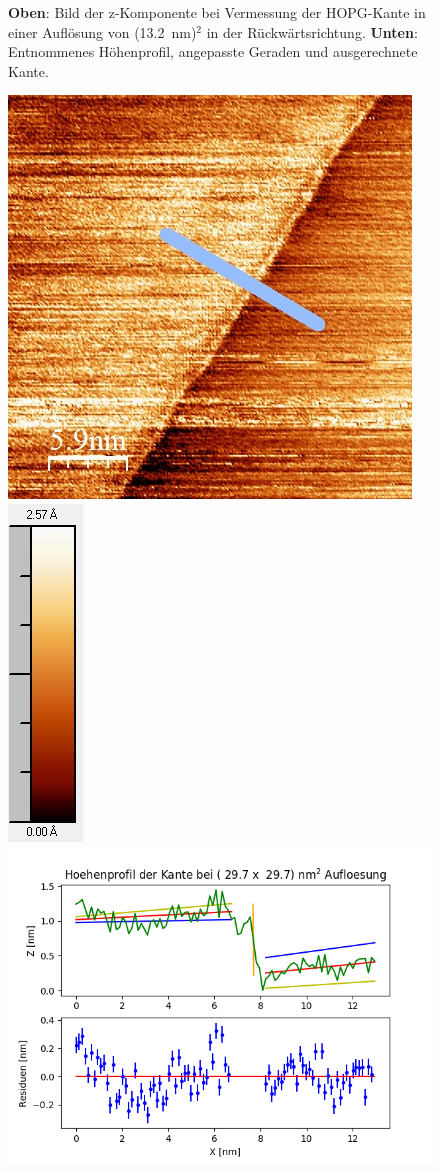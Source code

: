 \documentclass[12pt,a4paper]{article}
\begin{document}
\begin{figure}
\caption{\textbf{Oben}: Bild der z-Komponente bei Vermessung der HOPG-Kante in einer Auflösung von (\SI{13,2}{nm})$^2$ in der Rückwärtsrichtung. \textbf{Unten}: Entnommenes Höhenprofil, angepasste Geraden und ausgerechnete Kante.}
\end{figure}

\begin{figure}
\centering
\includegraphics[scale=0.6]{Bilder/Anhang/Kante/0297_Kante_vor.jpg}
\includegraphics[scale=0.6]{Bilder/Anhang/Kante/0297_Kante_vor_Skala.jpg}
\includegraphics[scale=0.6]{Bilder/Anhang/Kante/Profil_Kante_0297_vor.png}

\end{figure}
\end{document}
